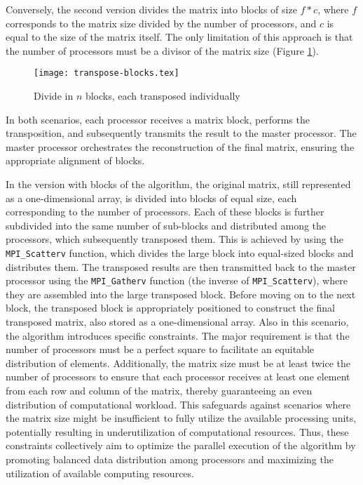 Conversely, the second version divides the matrix into blocks of size $f * c$, where $f$ corresponds to the matrix %
size divided by the number of processors, and $c$ is equal to the size of the matrix itself. The only limitation %
of this approach is that the number of processors must be a divisor of the matrix size (Figure \ref{image:transpose-blocks}).

\begin{figure}[h]
    \caption{\label{image:transpose-blocks}Divide in $n$ blocks, each transposed individually}
    \centering
    \texttt{[image: transpose-blocks.tex]}
\end{figure}

In both scenarios, each processor receives a matrix block, performs the transposition, and subsequently transmits the %
result to the master processor. The master processor orchestrates the reconstruction of the final matrix, ensuring the %
appropriate alignment of blocks.

In the version with blocks of the algorithm, the original matrix, still represented as a one-dimensional array, is divided %
into blocks of equal size, each corresponding to the number of processors. Each of these blocks is further subdivided %
into the same number of sub-blocks and distributed among the processors, which subsequently transposed them.
This is achieved by using the \texttt{MPI\_Scatterv} function, which divides the large block into equal-sized blocks and distributes them.
The transposed results are then transmitted back to the master processor using the \texttt{MPI\_Gatherv} function (the inverse of %
\texttt{MPI\_Scatterv}), where they are assembled into the large transposed block.
Before moving on to the next block, the transposed block is appropriately positioned to construct the final transposed %
matrix, also stored as a one-dimensional array. 
Also in this scenario, the algorithm introduces specific constraints. The major requirement is that the number of processors must be %
a perfect square to facilitate an equitable distribution of elements. Additionally, the matrix size must be at least twice the number %
of processors to ensure that each processor receives at least one element from each row and column of the matrix, thereby guaranteeing %
an even distribution of computational workload. This safeguards against scenarios where the matrix size might be insufficient to fully %
utilize the available processing units, potentially resulting in underutilization of computational resources. Thus, these constraints %
collectively aim to optimize the parallel execution of the algorithm by promoting balanced data distribution among processors and %
maximizing the utilization of available computing resources.

